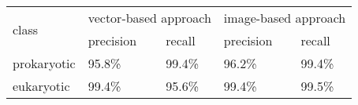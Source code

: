 \begin{table}[h]
\begin{tabular}{|l|l|l|l|l|}
\hline
\multirow{2}{*}{class} & \multicolumn{2}{l|}{vector-based approach} & \multicolumn{2}{l|}{image-based approach} \\ \cline{2-5} 
                       & precision             & recall             & precision             & recall            \\ \hline
prokaryotic            & 95.8\%                & 99.4\%             & 96.2\%                & 99.4\%            \\ \hline
eukaryotic             & 99.4\%                & 95.6\%             & 99.4\%                & 99.5\%            \\ \hline
\end{tabular}
\end{table}